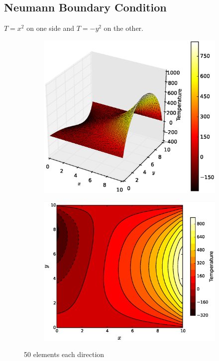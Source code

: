 \documentclass[10pt, a4paper]{article}
\begin{document}
\subsection{Neumann Boundary Condition}

$T = x^2$ on one side and $T=-y^2$ on the other.

\begin{figure}[H]
\centering
	\begin{subfigure}[H]{0.5\textwidth}
		\includegraphics[width=1.2\textwidth]{fig/figure_5.eps}
		\caption{}
		\label{fig:1}
	\end{subfigure}
	\begin{subfigure}[H]{0.3\textwidth}
		\includegraphics[width=\textwidth]{fig/figure_5.1.eps}
		\caption{}
		\label{fig:2}
	\end{subfigure}
	\caption{50 elements each direction}
	\label{fig:3_1}
\end{figure}
\end{document}
